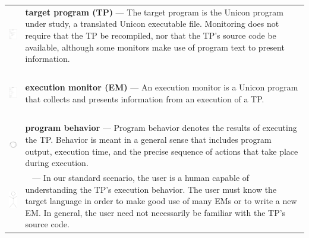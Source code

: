\begin{tabular}{m{0.95in} m{4.75in}}
\includegraphics[width=0.65in,height=0.85in]{tp.png} &
{\bf target program (TP)} ---
The target program is the Unicon program under study, a translated Unicon
executable file.
Monitoring does not require that the TP be recompiled, nor that
the TP's source code be available, although some monitors make use of
program text to present information. \index{target program!Alamo} \\
\includegraphics[width=0.65in,height=0.85in]{em.png} &
{\bf execution monitor (EM)} ---
An execution monitor is a Unicon program that collects and presents
information from an execution of a TP. \index{execution monitor!Alamo} \\
\includegraphics[width=0.6in,height=0.6in]{behave.png} &
{\bf program behavior} ---
Program behavior denotes the results of executing the TP.  Behavior is meant
in a general sense
that includes program output, execution time, and the precise sequence
of actions that take place during execution. \index{program behavior} \\
\includegraphics[height=0.7in]{user.png} &
\ \linebreak {\bf user} --- In our standard
scenario, the user is a human capable of understanding the TP's execution
behavior.  The user must know the target language in order to make good use
of many EMs or to write a new
EM.  In general, the user need not necessarily be familiar with the TP's
source code. \index{user!Alamo} \\
\end{tabular}

